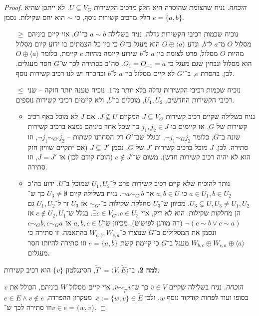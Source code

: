\documentclass[]{article}
\newcommand\ra    {\rangle}
\newcommand\la    {\langle}
\newcommand\tl    {\tilde}
\begin{document}
\begin{proof}
		\textit{הוכחה. }נניח שהצומת שהוסרה היא חלק מרכיב הקשירות $U \subseteq V_G$. לא ייתכן שהיא חלק מרכיב קשירות נוסף, כי $\sim$ הוא יחס שקילות. נסמן $e = \{a, b\}$. 
		\begin{itemize}
			\item[$\ge$] נוכיח שכמות רכיבי הקשירות גדלה. נניח בשלילה $a \sim b$ ב־$G'$, אזי קיים ביניהם מסלול $O$ מ־$a$  ל־$b$, ונדע $O \oplus \la a \ra$ הוא מעגל ב־$G$ כי בין כל הצמתים בו ידוע קיום מסלול מהיות $O$ מסלול, פרט לצומת בין $a$ ל־$b$ שידוע קיומה מהיות $e$ קיימת, כלומר $O \oplus \la a \ra$ הוא מסלול ונבחין שגם מעגל כי $O_1 = O_{-1} = a$. סה"כ בסתירה לכך ש־$G$ חסר מעגלים. לכן, בהסרת $e$, ב־$G'$ לא קיים מסלול בין $a$ ל־$b$ ובהכרח יש לנו רכיב קשירות נוסף. 
			\item[$\le$] נוכיח שכמות רכיבי הקשירות גדלה בלא יותר מ־$1$. נוכיח טענה יותר חזקה – שני רכיבי הקשירות החדשים, $U_1, U_2$, מוכלים ב־$U$, ולא קיימים רכיבי קשירות נוספים. 
			\begin{itemize}
				\item נניח בשלילה שקיים רכיב קשירות $J \subseteq V_{G}$ המקיים $J \nsubseteq U$. אם $J$ לא מוכל באף רכיב קשירות של $G$, אז קיימים בו $j_1, j_2 \in J$ כך שכל אחד ביניהם נמצא ברכיב קשירות שונה ב־$G$, כלומר $\lnot j_1 \sim_{G} j_2$, ובגלל שב־$G'$ רק הסחרנו קשתות – $\lnot j_1 \sim_{G'} j_2$, וזו סתירה. לכן, $J$ מוכל ברכיב קשירות $J'$ של $G$, נסמן $J \subsetneq J'$ (אם יתקיים שוויון חזק הוא לא יהיה רכיב קשירות חדש). משום ש־$e \notin J'$ (הוכח קודם לכן) אז $J = J'$, וזו סתירה.
				\item נותר להוכיח שלא קיים רכיב קשירות פרט ל־$U_1, U_2$ שמוכל ב־$U$. ידוע בה"כ $a \in U_1, b \in U_2$ כי $a, b \in U$ אך $\lnot a \sim_{G'} b$. נניח בשלילה קיום $U_3 \neq \emptyset$ כך ש־$U_3 \subsetneq U, U_3 \neq U_1, U_2$. מכיוון ש־$U_3$ מחלקת שקילות ב־$\sim_{G'}$ אז $U_3$ זר ל־$U_1, U_2$ גם הן מחלקות שקילות. הוא לא ריק, אזי $\exists c \in V_{G'}. c \in U_3$. בגלל ש־$c \notin U_2, U_1$ אז $\lnot (c \sim b \lor c \sim a)$ (דה מורגן לפישוט). מכיוון ש־$a, b, c \in U$ אז $c \sim_{G} b, c \sim_G a$ ונסמן את המסלולים ב־$G$ שנוצרו כ־$W_{c, b}, W_{c, a}$ בהתאמה. זו סתירה כי $W_{b, c} \oplus W_{c, a} \oplus \la a \ra$ מעגל ב־$G$ כי קיימת קשת $e = \{a, b\}$ וזו סתירה להיותו חסר מעגלים. 
			\end{itemize}
		\end{itemize}
		\textbf{למה 2. }ב־$\tl T' = \la V, \tl E \ra$, הסינגלטון $\{v\}$ הוא רכיב קשירות. 
		
		\textit{הוכחה. }נניח בשלילה שקיים $\bar v \in V$ כך ש־$\bar v \sim_{\tl T'} v$. אזי קיים מסלול $W$ ביניהם, הכולל את $v$ בסופו ועוד לפחות קודקוד נוסף $w$, ולכן $e := \{w, v\} \in \tl E$. מעקרון ההפרדה, $e \in E \land v \notin e$ וזו סתירה לכך ש־$v \in e = \{w, v\}$. 
		

\end{proof}
\end{document}
